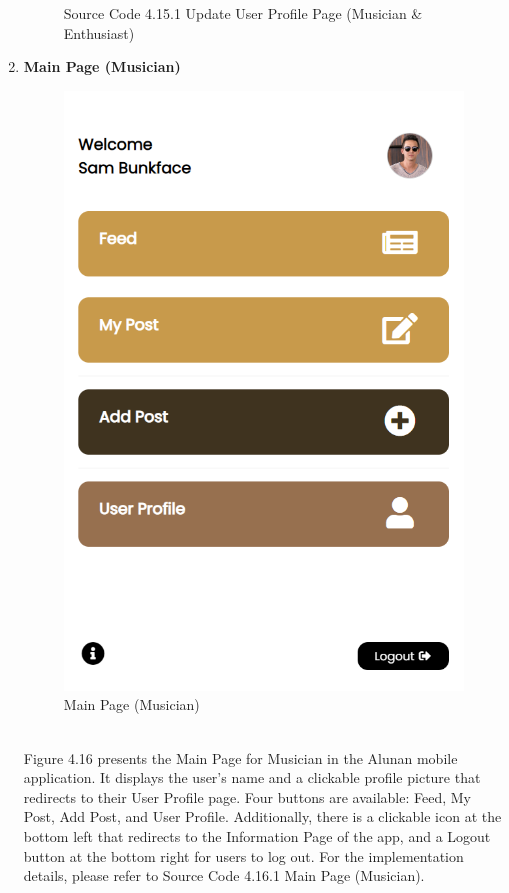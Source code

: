 \begin{enumerate}[1.]
\begin{figure}[h]
\begin{subfigure}[b]{0.7\textwidth}
            \label{fig:sub2}
        \end{subfigure}
        \caption*{Source Code 4.15.1 Update User Profile Page (Musician \& Enthusiast)}
        \label{fig:myfig54a}
    \end{figure}
    \clearpage

    \item \textbf{Main Page (Musician)}
    \begin{figure}[h]
        \centering
        \includegraphics[width=0.5\linewidth]{mainmatter/images/frontend/ss/Main Page (Musician).png}
        \caption{Main Page (Musician)}
        \label{fig:myfig55}
    \end{figure} \\
    Figure 4.16 presents the Main Page for Musician in the Alunan mobile application. It displays the user's name and a clickable profile picture that redirects to their User Profile page. Four buttons are available: Feed, My Post, Add Post, and User Profile. Additionally, there is a clickable icon at the bottom left that redirects to the Information Page of the app, and a Logout button at the bottom right for users to log out. For the implementation details, please refer to Source Code 4.16.1 Main Page (Musician).
    \clearpage
    \begin{figure}[h]\ContinuedFloat
        \centering
        \begin{subfigure}[b]{0.6\textwidth}
            \centering

\end{subfigure}
\end{figure}
\end{enumerate}
